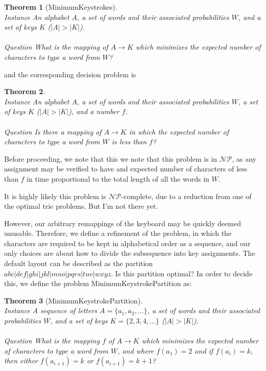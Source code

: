 \documentclass{article}
\newcommand{\NP}{\ensuremath{\mathcal{NP}}}
\newtheorem{theorem}{Theorem}
\begin{document}
\begin{theorem}[{\sc MinimumKeystrokes}]~\\
\label{thm:minstrokes}
{\sc Instance} An alphabet $A$, a set of words and their associated probabilities $W$, and a set of keys $K$ ($|A| > |K|$).\\
~\\
{\sc Question} What is the mapping of $A \to K$ which minimizes the expected number of characters to type a word from $W$?
\end{theorem}

and the corresponding decision problem is

\begin{theorem}~\\
{\sc Instance} An alphabet $A$, a set of words and their associated probabilities $W$, a set of keys $K$ ($|A| > |K|$), and a number $f$.\\
~\\
{\sc Question} Is there a mapping of $A \to K$ in which the expected number of characters to type a word from $W$ is less than $f$?
\end{theorem}

Before proceeding, we note that this we note that this problem is in \NP, as
any assignment may be verified to have and expected number of characters of
less than $f$ in time proportional to the total length of all the words in $W$.

It is highly likely this problem is \NP-complete, due to a reduction from one of the optimal trie problems.  But I'm not there yet.

However, our arbitrary remappings of the keyboard may be quickly deemed unusable.  Therefore, we define a refinement of the problem, in which the characters are required to be kept in alphabetical order as a sequence, and our only choices are about how to divide the subsequence into key assignments.  The default layout can be described as the partition $abc|def|ghi|jkl|mno|pqrs|tuv|wxyz$.  Is this partition optimal?  In order to decide this, we define the problem {\sc MinimumKeystrokePartition} as:
\begin{theorem}[{\sc MinimumKeystrokePartition}]~\\
\label{thm:minpartition}
{\sc Instance} A sequence of letters $A = \{a_1, a_2, \ldots \}$, a set of words and their associated probabilities $W$, and a set of keys $K = \{2, 3, 4, \ldots \}$ ($|A| > |K|$).\\
~\\
{\sc Question} What is the mapping $f$ of $A \to K$ which minimizes the expected number of characters to type a word from $W$, and where $f(a_1) = 2$ and if $f(a_i) = k$, then either $f(a_{i+1}) = k$ or $f(a_{i+1}) = k+1$?
\end{theorem}
\end{document}
